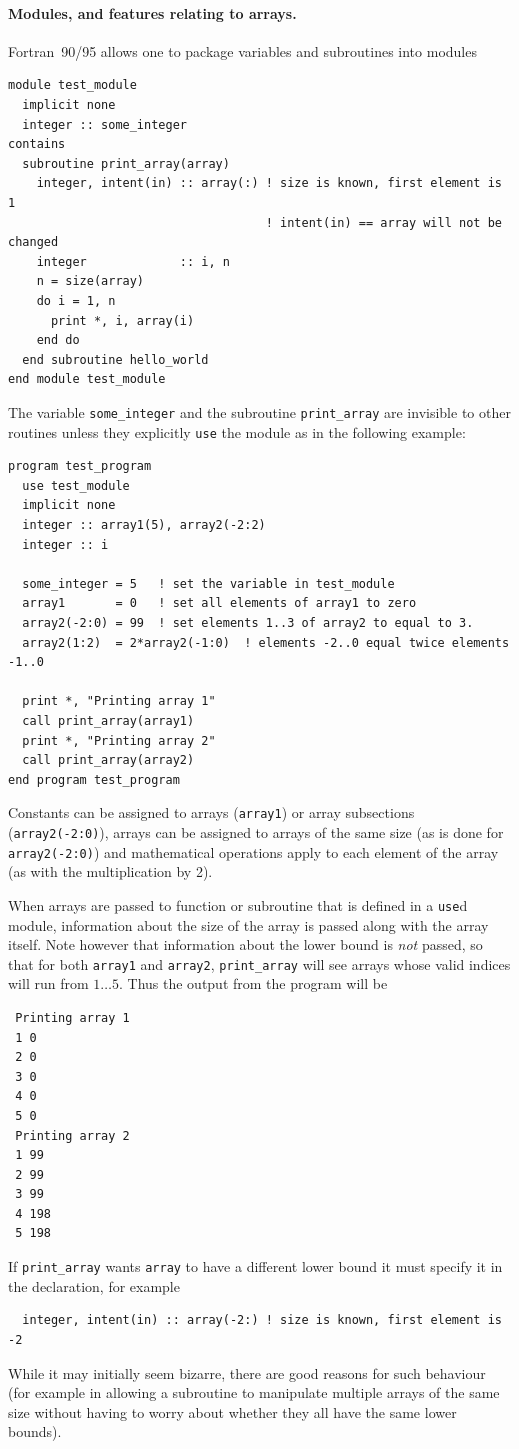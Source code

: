 \documentclass[12pt]{article}
\begin{document}
\paragraph{Modules, and features relating to arrays.} Fortran~90/95
allows one to package variables and subroutines into modules
\begin{verbatim}
module test_module
  implicit none
  integer :: some_integer
contains
  subroutine print_array(array)
    integer, intent(in) :: array(:) ! size is known, first element is 1
                                    ! intent(in) == array will not be changed
    integer             :: i, n
    n = size(array)
    do i = 1, n
      print *, i, array(i)
    end do
  end subroutine hello_world
end module test_module
\end{verbatim}
The variable \texttt{some\_integer} and the subroutine
\texttt{print\_array} are invisible to other routines unless they
explicitly \texttt{use} the module as in the following example:
\begin{verbatim}
program test_program
  use test_module
  implicit none
  integer :: array1(5), array2(-2:2)
  integer :: i
  
  some_integer = 5   ! set the variable in test_module
  array1       = 0   ! set all elements of array1 to zero
  array2(-2:0) = 99  ! set elements 1..3 of array2 to equal to 3.
  array2(1:2)  = 2*array2(-1:0)  ! elements -2..0 equal twice elements -1..0

  print *, "Printing array 1"
  call print_array(array1)
  print *, "Printing array 2"
  call print_array(array2)
end program test_program
\end{verbatim}
Constants can be assigned to arrays (\texttt{array1}) or array
subsections (\texttt{array2(-2:0)}), arrays can be assigned to arrays
of the same size (as is done for \texttt{array2(-2:0)}) and
mathematical operations apply to each element of the array (as with
the multiplication by 2).

When arrays are passed to function or subroutine that is defined in a
\texttt{use}d module, information about the size of the array is
passed along with the array itself. Note however that information
about the lower bound is \emph{not} passed, so that for both
\texttt{array1} and \texttt{array2}, \texttt{print\_array} will see
arrays whose valid indices will run from $1\ldots5$. Thus the output
from the program will be
\begin{verbatim}
 Printing array 1
 1 0
 2 0
 3 0
 4 0
 5 0
 Printing array 2
 1 99
 2 99
 3 99
 4 198
 5 198
\end{verbatim}
If \texttt{print\_array} wants \texttt{array} to have a different lower
bound it must specify it in the declaration, for example
\begin{verbatim}
  integer, intent(in) :: array(-2:) ! size is known, first element is -2
\end{verbatim}
While it may initially seem bizarre, there are good reasons for such
behaviour (for example in allowing a subroutine to manipulate multiple
arrays of the same size without having to worry about whether they all
have the same lower bounds).
\end{document}
